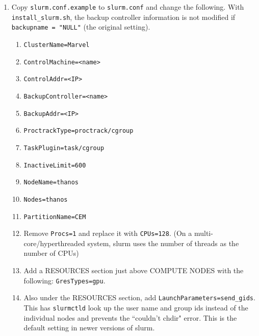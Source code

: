 \begin{enumerate}
\begin{enumerate}
      \item Copy \texttt{slurm.conf.example} to \texttt{slurm.conf} and change the following. With \texttt{install\_slurm.sh}, the backup controller information is not modified if \texttt{backupname = "NULL"} (the original setting).

        \begin{enumerate}
          \item \texttt{ClusterName=Marvel}

          \item \texttt{ControlMachine=<name>}

          \item \texttt{ControlAddr=<IP>}

          \item \texttt{BackupController=<name>}

          \item \texttt{BackupAddr=<IP>}

          \item \texttt{ProctrackType=proctrack/cgroup}	

          \item \texttt{TaskPlugin=task/cgroup}

          \item \texttt{InactiveLimit=600}	

          \item \texttt{NodeName=thanos}

          \item \texttt{Nodes=thanos}

          \item \texttt{PartitionName=CEM}

          \item Remove \texttt{Procs=1} and replace it with \texttt{CPUs=128}. (On a multi-core/hyperthreaded system, slurm uses the number of threads as the number of CPUs)

          \item Add a RESOURCES section just above COMPUTE NODES with the following: \texttt{GresTypes=gpu}.

          \item Also under the RESOURCES section, add \texttt{LaunchParameters=send\_gids}. This has \texttt{slurmctld} look up the user name and group ids instead of the individual nodes and prevents the ``couldn't chdir" error. This is the default setting in newer versions of slurm.


\end{enumerate}
\end{enumerate}
\end{enumerate}
